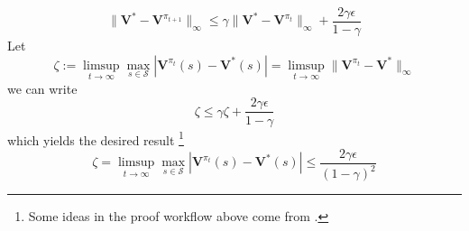 \begin{Solution}
\begin{equation}
    \|\mathbf{V}^* - \mathbf{V}^{\pi_{t+1}}\|_\infty \leq \gamma \|\mathbf{V}^* - \mathbf{V}^{\pi_t}\|_\infty + \frac{2 \gamma \epsilon}{1 - \gamma}
\end{equation}
Let
$$
\zeta := \limsup_{t \rightarrow \infty} \max_{s \in \mathcal{S}}  |\mathbf{V}^{\pi_t}(s) - \mathbf{V}^*(s)| = \limsup_{t \rightarrow \infty} \|\mathbf{V}^{\pi_t} - \mathbf{V}^*\|_\infty
$$
we can write
$$
\zeta \leq \gamma \zeta + \frac{2 \gamma \epsilon}{1 - \gamma}
$$
which yields the desired result \footnote{Some ideas in the proof workflow above come from \cite{ie3186}.}
$$
\zeta = \limsup_{t \rightarrow \infty} \max_{s \in \mathcal{S}}  |\mathbf{V}^{\pi_t}(s) - \mathbf{V}^*(s)| \le \frac{2 \gamma \epsilon}{(1 - \gamma)^2}
$$

\end{Solution}
